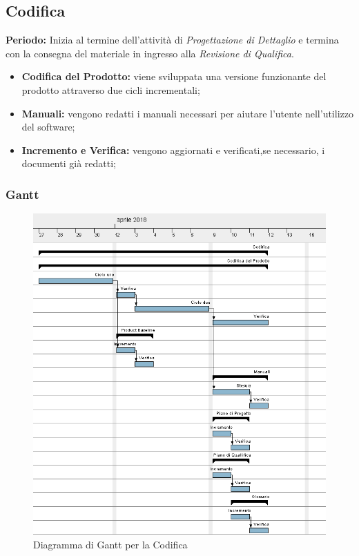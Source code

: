\subsection{Codifica}
    \textbf{Periodo:}
    Inizia al termine dell'attività di \emph{Progettazione di Dettaglio} e termina con la consegna del materiale in ingresso alla \emph{Revisione di Qualifica}.
    \begin{itemize}
    	\item \textbf{Codifica del Prodotto:} viene sviluppata una versione funzionante del prodotto attraverso due cicli incrementali;
    	\item \textbf{Manuali:} vengono redatti i manuali necessari per aiutare l'utente nell'utilizzo del software;
    	\item \textbf{Incremento e Verifica:} vengono aggiornati e verificati,se necessario, i documenti già redatti;
    \end{itemize}
\subsubsection{Gantt}
\begin{figure}[h!]
	\centering 
	\includegraphics[width=1\textwidth]{images/Codifica.png}
	\caption{Diagramma di Gantt per la Codifica}
	\label{graficobello5} 
\end{figure}
